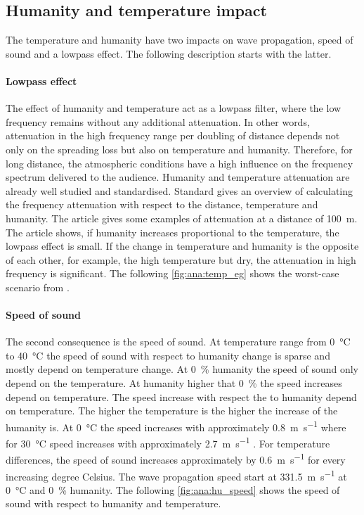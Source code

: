 \subsection{Humanity and temperature impact}\label{sec:ana:hu_temp}
The temperature and humanity have two impacts on wave propagation, speed of sound and a lowpass effect. The following description starts with the latter. 

\paragraph{Lowpass effect} The effect of humanity and temperature act as a lowpass filter, where the low frequency remains without any additional attenuation. In other words, attenuation in the high frequency range per doubling of distance depends not only on the spreading loss but also on temperature and humanity. Therefore, for long distance, the atmospheric conditions have a high influence on the frequency spectrum delivered to the audience. Humanity and temperature attenuation are already well studied and standardised. Standard \citep{iso_9613-1} gives an overview of calculating the frequency attenuation with respect to the distance, temperature and humanity. The article \citep{corteel2017large} gives some examples of attenuation at a distance of \SI{100}{\meter}. The article shows, if humanity increases proportional to the temperature, the lowpass effect is small. If the change in temperature and humanity is the opposite of each other, for example, the high temperature but dry, the attenuation in high frequency is significant. The following \autoref{fig:ana:temp_eg} shows the worst-case scenario from \citep{corteel2017large}.

 

\paragraph{Speed of sound} The second consequence is the speed of sound. At temperature range from \SI{0}{\celsius} to \SI{40}{\celsius} the speed of sound with respect to humanity change is sparse and mostly depend on temperature change. At \SI{0}{\percent} humanity the speed of sound only depend on the temperature. At humanity higher that \SI{0}{\percent} the speed increases depend on temperature. The speed increase with respect the to humanity depend on temperature. The higher the temperature is the higher the increase of the humanity is. At \SI{0}{\celsius} the speed increases with approximately \SI{0.8}{\meter\per\second} where for \SI{30}{\celsius} speed increases with approximately \SI{2.7}{\meter\per\second} \citep{humanity_effect_on_speed}. For temperature differences, the speed of sound increases approximately by \SI{0.6}{\meter\per\second} for every increasing degree Celsius. The wave propagation speed start at \SI{331.5}{\meter\per\second} at \SI{0}{\celsius} and \SI{0}{\percent} humanity. The following \autoref{fig:ana:hu_speed} shows the speed of sound with respect to humanity and temperature. 


